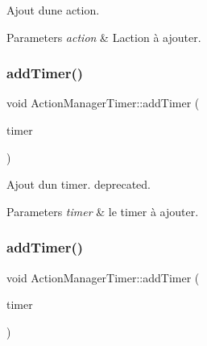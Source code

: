 Ajout d\textquotesingle{}une action. 


\begin{DoxyParams}{Parameters}
{\em action} & L\textquotesingle{}action à ajouter. \\
\hline
\end{DoxyParams}
\mbox{\label{classActionManagerTimer_a37abad611ac11d81f2ebcb8d9d5766f8}} 
\subsubsection{\texorpdfstring{add\+Timer()}{addTimer()}\hspace{0.1cm}{\footnotesize\ttfamily [1/2]}}
{\footnotesize\ttfamily void Action\+Manager\+Timer\+::add\+Timer (\begin{DoxyParamCaption}\item[{\hyperlink{classITimerListener}{I\+Timer\+Listener} $\ast$}]{timer }\end{DoxyParamCaption})\hspace{0.3cm}{\ttfamily [inline]}}



Ajout d\textquotesingle{}un timer. deprecated. 


\begin{DoxyParams}{Parameters}
{\em timer} & le timer à ajouter. \\
\hline
\end{DoxyParams}
\mbox{\label{classActionManagerTimer_a4d893b58bd1d02a9a610eabea05bec1a}} 
\subsubsection{\texorpdfstring{add\+Timer()}{addTimer()}\hspace{0.1cm}{\footnotesize\ttfamily [2/2]}}
{\footnotesize\ttfamily void Action\+Manager\+Timer\+::add\+Timer (\begin{DoxyParamCaption}\item[{\hyperlink{classITimerPosixListener}{I\+Timer\+Posix\+Listener} $\ast$}]{timer }\end{DoxyParamCaption})\hspace{0.3cm}{\ttfamily [inline]}}



